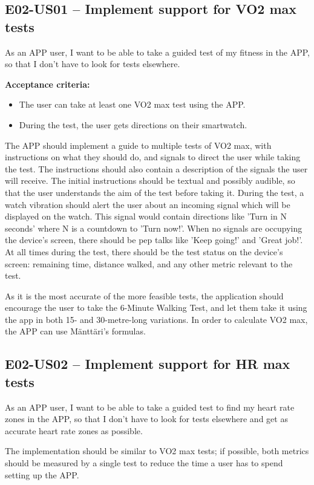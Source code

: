 \subsection*{E02-US01 -- Implement support for VO2 max tests}
As an APP user, I want to be able to take a guided test of my fitness in the APP, so that I don't have to look for tests elsewhere.

\textbf{Acceptance criteria:}
\begin{itemize}
    \item The user can take at least one VO2 max test using the APP.
    \item During the test, the user gets directions on their smartwatch.
\end{itemize}

The APP should implement a guide to multiple tests of VO2 max, with instructions on what they should do, and signals to direct the user while taking the test.
The instructions should also contain a description of the signals the user will receive.
The initial instructions should be textual and possibly audible, so that the user understands the aim of the test before taking it.
During the test, a watch vibration should alert the user about an incoming signal which will be displayed on the watch.
This signal would contain directions like 'Turn in N seconds' where N is a countdown to 'Turn now!'.
When no signals are occupying the device's screen, there should be pep talks like 'Keep going!' and 'Great job!'.
At all times during the test, there should be the test status on the device's screen: remaining time, distance walked, and any other metric relevant to the test.

As it is the most accurate of the more feasible tests, the application should encourage the user to take the 6-Minute Walking Test, and let them take it using the app in both 15- and 30-metre-long variations.
In order to calculate VO2 max, the APP can use Mänttäri's formulas.

\subsection*{E02-US02 -- Implement support for HR max tests}
As an APP user, I want to be able to take a guided test to find my heart rate zones in the APP, so that I don't have to look for tests elsewhere and get as accurate heart rate zones as possible.

The implementation should be similar to VO2 max tests; if possible, both metrics should be measured by a single test to reduce the time a user has to spend setting up the APP.

